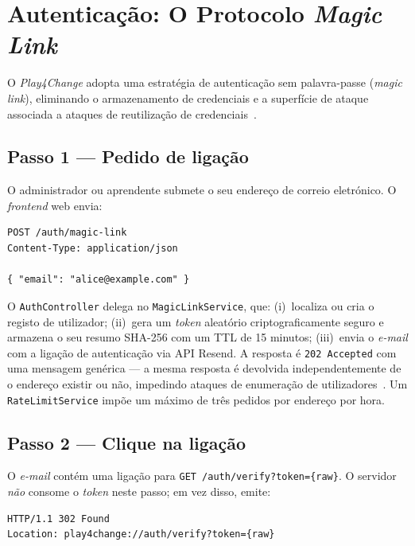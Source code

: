\section{Autenticação: O Protocolo \textit{Magic Link}}
\label{sec:auth_deepdive}

O \textit{Play4Change} adopta uma estratégia de autenticação sem palavra-passe
(\textit{magic link}), eliminando o armazenamento de credenciais e a
superfície de ataque associada a ataques de reutilização de
credenciais~\cite{owasp2021a07}.

\subsection*{Passo 1 — Pedido de ligação}

O administrador ou aprendente submete o seu endereço de correio eletrónico.
O \textit{frontend} web envia:

\begin{verbatim}
POST /auth/magic-link
Content-Type: application/json

{ "email": "alice@example.com" }
\end{verbatim}

O \texttt{AuthController} delega no \texttt{MagicLinkService}, que:
(i)~localiza ou cria o registo de utilizador;
(ii)~gera um \textit{token} aleatório criptograficamente seguro e armazena
o seu resumo SHA-256 com um TTL de 15 minutos;
(iii)~envia o \textit{e-mail} com a ligação de autenticação via API Resend.
A resposta é \texttt{202 Accepted} com uma mensagem genérica — a mesma
resposta é devolvida independentemente de o endereço existir ou não,
impedindo ataques de enumeração de utilizadores~\cite{owasp2021a05}.
Um \texttt{RateLimitService} impõe um máximo de três pedidos por endereço
por hora.

\subsection*{Passo 2 — Clique na ligação}

O \textit{e-mail} contém uma ligação para \texttt{GET /auth/verify?token=\{raw\}}.
O servidor \emph{não} consome o \textit{token} neste passo; em vez disso,
emite:

\begin{verbatim}
HTTP/1.1 302 Found
Location: play4change://auth/verify?token={raw}
\end{verbatim}

